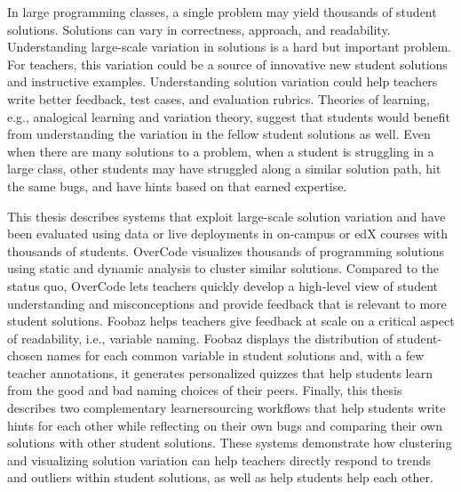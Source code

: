 \cleardoublepage
\pagestyle{empty}
\setcounter{savepage}{\thepage}
\begin{abstractpage}
In large programming classes, a single problem may yield thousands of student solutions. Solutions can vary in correctness, approach, and readability. Understanding large-scale variation in solutions is a hard but important problem. For teachers, this variation could be a source of innovative new student solutions and instructive examples. Understanding solution variation could help teachers write better feedback, test cases, and evaluation rubrics. Theories of learning, e.g., analogical learning and variation theory, suggest that students would benefit from understanding the variation in the fellow student solutions as well. Even when there are many solutions to a problem, when a student is struggling in a large class, other students may have struggled along a similar solution path, hit the same bugs, and have hints based on that earned expertise.

This thesis describes systems that exploit large-scale solution variation and have been evaluated using data or live deployments in on-campus or edX courses with thousands of students. OverCode visualizes thousands of programming solutions using static and dynamic analysis to cluster similar solutions. Compared to the status quo, OverCode lets teachers quickly develop a high-level view of student understanding and misconceptions and provide feedback that is relevant to more student solutions. Foobaz helps teachers give feedback at scale on a critical aspect of readability, i.e., variable naming. Foobaz displays the distribution of student-chosen names for each common variable in student solutions and, with a few teacher annotations, it generates personalized quizzes that help students learn from the good and bad naming choices of their peers. Finally, this thesis describes two complementary learnersourcing workflows that help students write hints for each other while reflecting on their own bugs and comparing their own solutions with other student solutions. These systems demonstrate how clustering and visualizing solution variation can help teachers directly respond to trends and outliers within student solutions, as well as help students help each other.
\end{abstractpage}

